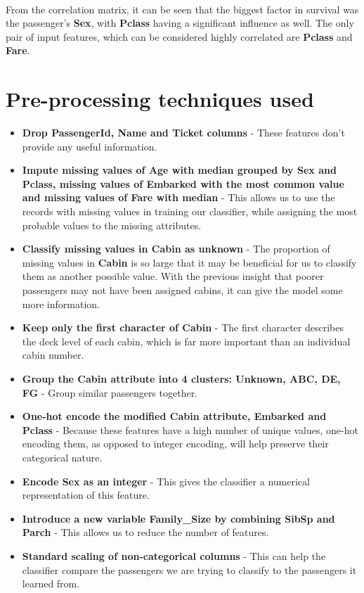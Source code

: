 \documentclass{article}
\begin{document}
\paragraph{}From the correlation matrix, it can be seen that the biggest factor in survival was the passenger's \textbf{Sex}, with \textbf{Pclass} having a significant influence as well. The only pair of input features, which can be considered highly correlated are \textbf{Pclass} and \textbf{Fare}.
\newpage
\section{Pre-processing techniques used}
\begin{itemize}
    \item \textbf{Drop PassengerId, Name and Ticket columns} - These features don't provide any useful information.
    \item \textbf{Impute missing values of Age with median grouped by Sex and Pclass, missing values of Embarked with the most common value and missing values of Fare with median} - This allows us to use the records with missing values in training our classifier, while assigning the most probable values to the missing attributes.
    \item \textbf{Classify missing values in Cabin as unknown} - The proportion of missing values in \textbf{Cabin} is so large that it may be beneficial for us to classify them as another possible value. With the previous insight that poorer passengers may not have been assigned cabins, it can give the model some more information.
    \item \textbf{Keep only the first character of Cabin} - The first character describes the deck level of each cabin, which is far more important than an individual cabin number.
    \item \textbf{Group the Cabin attribute into 4 clusters: Unknown, ABC, DE, FG} - Group similar passengers together.
    \item \textbf{One-hot encode the modified Cabin attribute, Embarked and Pclass} - Because these features have a high number of unique values, one-hot encoding them, as opposed to integer encoding, will help preserve their categorical nature.
    \item \textbf{Encode Sex as an integer} - This gives the classifier a numerical representation of this feature.
    \item \textbf{Introduce a new variable Family\_Size by combining SibSp and Parch} - This allows us to reduce the number of features.
    \item \textbf{Standard scaling of non-categorical columns} - This can help the classifier compare the passengers we are trying to classify to the passengers it learned from.
\end{itemize}
\newpage
\end{document}
